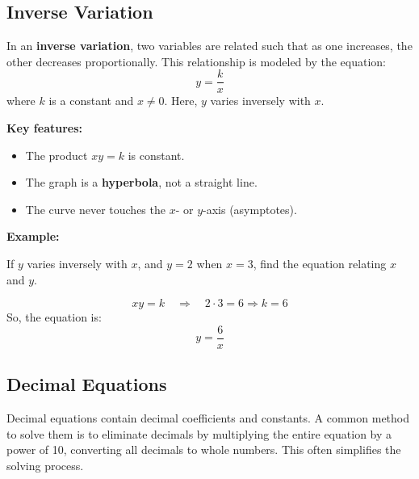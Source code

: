 \documentclass[11pt]{article}
\begin{document}
\subsection{Inverse Variation}

In an \textbf{inverse variation}, two variables are related such that as one increases, the other decreases proportionally. This relationship is modeled by the equation:
\[
y = \frac{k}{x}
\]
where \( k \) is a constant and \( x \neq 0 \). Here, \( y \) varies inversely with \( x \).

\textbf{Key features:}
\begin{itemize}
  \item The product \( xy = k \) is constant.
  \item The graph is a \textbf{hyperbola}, not a straight line.
  \item The curve never touches the \( x \)- or \( y \)-axis (asymptotes).
\end{itemize}

\textbf{Example:}

If \( y \) varies inversely with \( x \), and \( y = 2 \) when \( x = 3 \), find the equation relating \( x \) and \( y \).

\[
xy = k \quad \Rightarrow \quad 2 \cdot 3 = 6 \Rightarrow k = 6
\]
So, the equation is:
\[
y = \frac{6}{x}
\]

\begin{center}
\end{center}

\subsection{Decimal Equations}

Decimal equations contain decimal coefficients and constants. A common method to solve them is to eliminate decimals by multiplying the entire equation by a power of 10, converting all decimals to whole numbers. This often simplifies the solving process.
\end{document}
